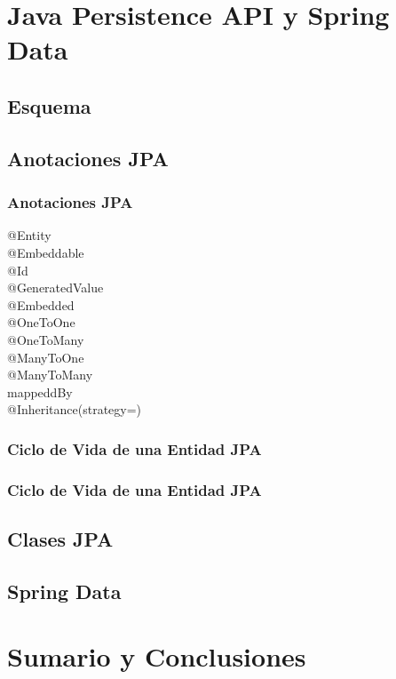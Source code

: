 \documentclass[a4paper,slidestop,xcolor=pst,blue]{beamer}
\begin{document}
\section{Java Persistence API y Spring Data}

\subsection{Esquema}

\subsection{Anotaciones JPA}

\begin{frame}[c]
    \frametitle{Anotaciones JPA}
    \begin{description}
        \item[@Entity]
        \item[@Embeddable]
        \item[@Id]
        \item[@GeneratedValue]
        \item[@Embedded]
        \item[@OneToOne]
        \item[@OneToMany]
        \item[@ManyToOne]
        \item[@ManyToMany]
        \item[mappeddBy]
        \item[@Inheritance(strategy=)]
    \end{description}
\end{frame}

\begin{frame}[c]
    \frametitle{Ciclo de Vida de una Entidad JPA}
\end{frame}

\begin{frame}[c]
    \frametitle{Ciclo de Vida de una Entidad JPA}
\end{frame}


\subsection{Clases JPA}

\subsection{Spring Data}

\section{Sumario y Conclusiones}
\end{document}
